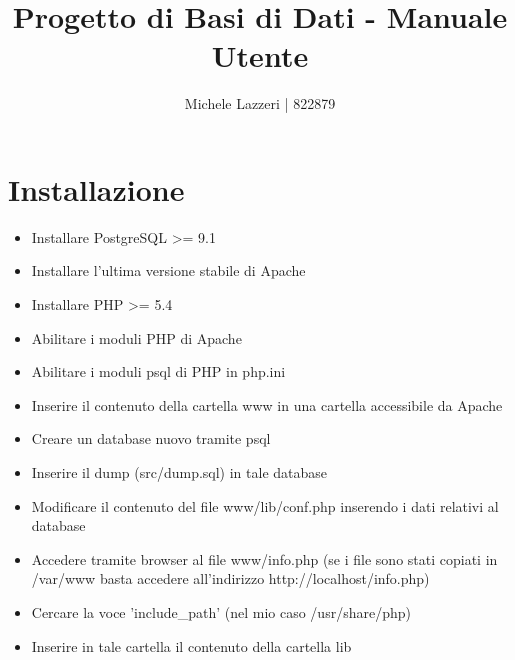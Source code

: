 \documentclass[a4paper,10pt]{article}
\title{Progetto di Basi di Dati - Manuale Utente}
\author{Michele Lazzeri | 822879}
\date{}
\begin{document}
\maketitle
\section{Installazione}
\begin{itemize}
\item Installare PostgreSQL >= 9.1
\item Installare l'ultima versione stabile di Apache
\item Installare PHP >= 5.4
\item Abilitare i moduli PHP di Apache
\item Abilitare i moduli psql di PHP in php.ini
\item Inserire il contenuto della cartella www in una cartella accessibile da Apache
\item Creare un database nuovo tramite psql
\item Inserire il dump (src/dump.sql) in tale database
\item Modificare il contenuto del file www/lib/conf.php inserendo i dati relativi al database
\item Accedere tramite browser al file www/info.php (se i file sono stati copiati in /var/www basta accedere all'indirizzo http://localhost/info.php)
\item Cercare la voce 'include\_{}path' (nel mio caso /usr/share/php)
\item Inserire in tale cartella il contenuto della cartella lib

\end{itemize}
\end{document}
